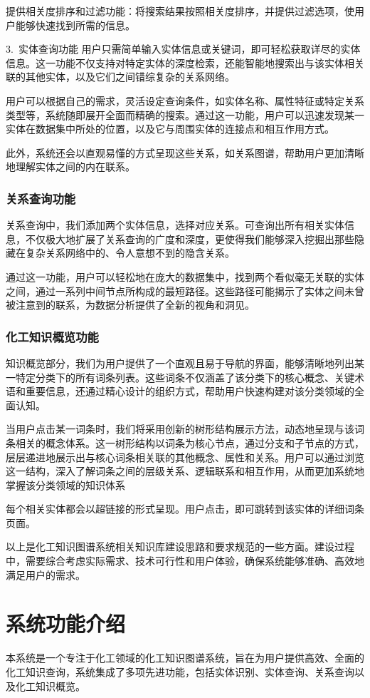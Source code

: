 提供相关度排序和过滤功能：将搜索结果按照相关度排序，并提供过滤选项，使用户能够快速找到所需的信息。 

3.~{实体查询功能} 
用户只需简单输入实体信息或关键词，即可轻松获取详尽的实体信息。这一功能不仅支持对特定实体的深度检索，还能智能地搜索出与该实体相关联的其他实体，以及它们之间错综复杂的关系网络。

用户可以根据自己的需求，灵活设定查询条件，如实体名称、属性特征或特定关系类型等，系统随即展开全面而精确的搜索。通过这一功能，用户可以迅速发现某一实体在数据集中所处的位置，以及它与周围实体的连接点和相互作用方式。

此外，系统还会以直观易懂的方式呈现这些关系，如关系图谱，帮助用户更加清晰地理解实体之间的内在联系。

\subsubsection{关系查询功能} 
关系查询中，我们添加两个实体信息，选择对应关系。可查询出所有相关实体信息，不仅极大地扩展了关系查询的广度和深度，更使得我们能够深入挖掘出那些隐藏在复杂关系网络中的、令人意想不到的隐含关系。

通过这一功能，用户可以轻松地在庞大的数据集中，找到两个看似毫无关联的实体之间，通过一系列中间节点所构成的最短路径。这些路径可能揭示了实体之间未曾被注意到的联系，为数据分析提供了全新的视角和洞见。

\subsubsection{化工知识概览功能} 
知识概览部分，我们为用户提供了一个直观且易于导航的界面，能够清晰地列出某一特定分类下的所有词条列表。这些词条不仅涵盖了该分类下的核心概念、关键术语和重要信息，还通过精心设计的组织方式，帮助用户快速构建对该分类领域的全面认知。

当用户点击某一词条时，我们将采用创新的树形结构展示方法，动态地呈现与该词条相关的概念体系。这一树形结构以词条为核心节点，通过分支和子节点的方式，层层递进地展示出与核心词条相关联的其他概念、属性和关系。用户可以通过浏览这一结构，深入了解词条之间的层级关系、逻辑联系和相互作用，从而更加系统地掌握该分类领域的知识体系

每个相关实体都会以超链接的形式呈现。用户点击，即可跳转到该实体的详细词条页面。

以上是化工知识图谱系统相关知识库建设思路和要求规范的一些方面。建设过程中，需要综合考虑实际需求、技术可行性和用户体验，确保系统能够准确、高效地满足用户的需求。

\section{系统功能介绍} 
本系统是一个专注于化工领域的化工知识图谱系统，旨在为用户提供高效、全面的化工知识查询，系统集成了多项先进功能，包括实体识别、实体查询、关系查询以及化工知识概览。

